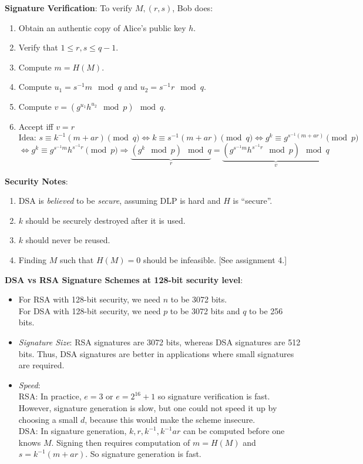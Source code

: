 \documentclass[a4paper,12pt]{article}
\begin{document}
{\bf Signature Verification}: To verify $M, (r,s)$, Bob does:
\begin{enumerate}[1.]
\item Obtain an authentic copy of Alice's public key $h$.
\item Verify that $1 \le r,s \le q-1$.
\item Compute $m = H(M)$.
\item Compute $u_1 = s^{-1}m \mod q$ and $u_2 = s^{-1}r \mod q$.
\item Compute $v = (g^{u_1}h^{u_2} \mod p) \mod q$.
\item Accept iff $v = r$
\[
\text{Idea: }s \equiv k^{-1}(m+ar) \pmod q \iff k \equiv s^{-1}(m+ar) \pmod q \iff g^k \equiv g^{s^{-1}(m+ar)} \pmod p 
\]\[
\iff g^k \equiv g^{s^{-1}m}h^{s^{-1}r} \pmod p \Rightarrow \underbrace{(g^k \mod p) \mod q}_r = \underbrace{(g^{s^{-1}m}h^{s^{-1}r} \mod p) \mod q}_v
\]
\end{enumerate}

{\bf Security Notes}:
\begin{enumerate}[1.]
\item DSA is {\em believed} to be {\em secure}, assuming DLP is hard and $H$ is ``secure''.
\item $k$ should be securely destroyed after it is used.
\item $k$ should never be reused.
\item Finding $M$ such that $H(M) = 0$ should be infeasible. [See assignment 4.]
\end{enumerate}

{\bf DSA vs RSA Signature Schemes at 128-bit security level}:
\begin{itemize}
\item For RSA with 128-bit security, we need $n$ to be 3072 bits. \\
For DSA with 128-bit security, we need $p$ to be 3072 bits and $q$ to be 256 bits.
\item {\em Signature Size}: RSA signatures are 3072 bits, whereas DSA signatures are 512 bits. Thus, DSA signatures are better in applications where small signatures are required.
\item {\em Speed}: \\
RSA: In practice, $e = 3$ or $e = 2^{16} + 1$ so signature verification is fast. However, signature generation is slow, but one could not speed it up by choosing a small $d$, because this would make the scheme insecure. \\
DSA: In signature generation, $k, r, k^{-1}, k^{-1}ar$ can be computed before one knows $M$. Signing then requires computation of $m = H(M)$ and
$s = k^{-1}(m + ar)$. So signature generation is fast.
\end{itemize}
\end{document}
